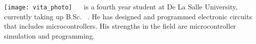 
\texttt{[image: vita\_photo]}
 \  \ is a fourth year student at De La Salle University, currently taking up B.Sc. \degree \ . He has designed and programmed electronic circuits that includes microcontrollers. His strengths in the field are microcontroller simulation and programming.

\vfill
